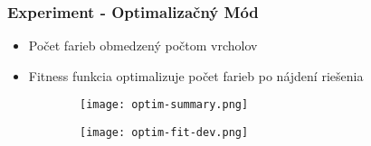 \begin{frame}
	\frametitle{Experiment - Optimalizačný Mód}
	\begin{itemize}
		\item Počet farieb obmedzený počtom vrcholov
		\item Fitness funkcia optimalizuje počet farieb po nájdení riešenia
	\end{itemize}
	\begin{table}
		\caption{Agregované výsledky 100 behov na grafe \emph{1-FullIns4}\footnote{Link to Graph}}
	\end{table}

	\begin{figure}
		\begin{subfigure}{.5\textwidth}
			\texttt{[image: optim-summary.png]}
		\end{subfigure}%
		\begin{subfigure}{.5\textwidth}
			\texttt{[image: optim-fit-dev.png]}
		\end{subfigure}
		
	\end{figure}

\end{frame}

